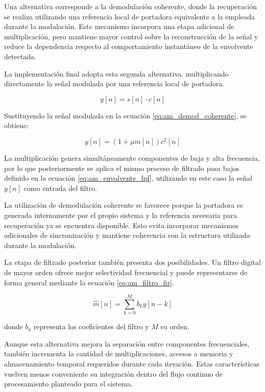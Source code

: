 Una alternativa corresponde a la demodulación coherente, donde la recuperación se realiza utilizando una referencia local de portadora equivalente a la empleada durante la modulación. Este mecanismo incorpora una etapa adicional de multiplicación, pero mantiene mayor control sobre la reconstrucción de la señal y reduce la dependencia respecto al comportamiento instantáneo de la envolvente detectada.

La implementación final adopta esta segunda alternativa, multiplicando directamente la señal modulada por una referencia local de portadora.

\begin{equation}
y[n] = s[n] \cdot c[n]
\label{eq:am_demod_coherente}
\end{equation}

Sustituyendo la señal modulada en la ecuación \eqref{eq:am_demod_coherente}, se obtiene:

\begin{equation}
y[n] = \left(1 + \mu m[n]\right)c^2[n]
\label{eq:am_demod_coherente_expandida}
\end{equation}

La multiplicación genera simultáneamente componentes de baja y alta frecuencia, por lo que posteriormente se aplica el mismo proceso de filtrado pasa bajos definido en la ecuación \eqref{eq:am_envolvente_lpf}, utilizando en este caso la señal $y[n]$ como entrada del filtro.

La utilización de demodulación coherente se favorece porque la portadora es generada internamente por el propio sistema y la referencia necesaria para recuperación ya se encuentra disponible. Esto evita incorporar mecanismos adicionales de sincronización y mantiene coherencia con la estructura utilizada durante la modulación.

La etapa de filtrado posterior también presenta dos posibilidades. Un filtro digital de mayor orden ofrece mejor selectividad frecuencial y puede representarse de forma general mediante la ecuación \eqref{eq:am_filtro_fir}.

\begin{equation}
\hat{m}[n] = \sum_{k=0}^{M} b_k y[n-k]
\label{eq:am_filtro_fir}
\end{equation}

donde $b_k$ representa los coeficientes del filtro y $M$ su orden.

Aunque esta alternativa mejora la separación entre componentes frecuenciales, también incrementa la cantidad de multiplicaciones, accesos a memoria y almacenamiento temporal requeridos durante cada iteración. Estas características vuelven menos conveniente su integración dentro del flujo continuo de procesamiento planteado para el sistema.

